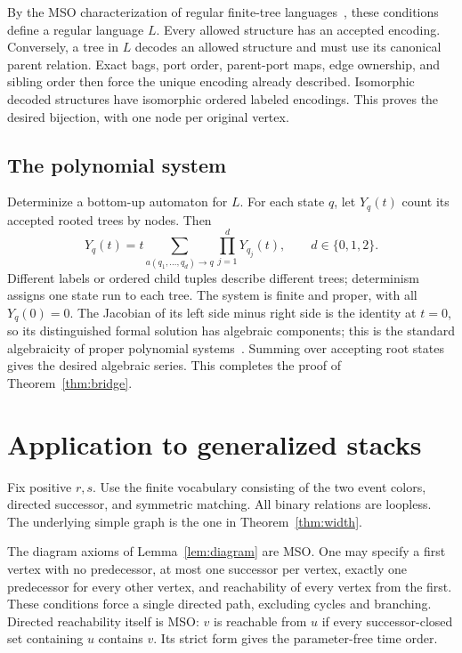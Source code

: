 \documentclass[11pt]{article}
\theoremstyle{definition}\newtheorem{definition}[theorem]{Definition}
\theoremstyle{remark}\newtheorem{remark}[theorem]{Remark}
\begin{document}
By the MSO characterization of regular finite-tree languages~\cite{ThatcherWright1968,Doner1970}, these conditions define a regular language $L$. Every allowed structure has an accepted encoding. Conversely, a tree in $L$ decodes an allowed structure and must use its canonical parent relation. Exact bags, port order, parent-port maps, edge ownership, and sibling order then force the unique encoding already described. Isomorphic decoded structures have isomorphic ordered labeled encodings. This proves the desired bijection, with one node per original vertex.

\subsection{The polynomial system}
Determinize a bottom-up automaton for $L$. For each state $q$, let $Y_q(t)$ count its accepted rooted trees by nodes. Then
\begin{equation}\label{eq:treesystem}
 Y_q(t)=t\sum_{a(q_1,\ldots,q_d)\to q}\prod_{j=1}^dY_{q_j}(t),
 \qquad d\in\{0,1,2\}.
\end{equation}
Different labels or ordered child tuples describe different trees; determinism assigns one state run to each tree. The system is finite and proper, with all $Y_q(0)=0$. The Jacobian of its left side minus right side is the identity at $t=0$, so its distinguished formal solution has algebraic components; this is the standard algebraicity of proper polynomial systems~\cite[Chapter VII]{FlajoletSedgewick2009}. Summing over accepting root states gives the desired algebraic series. This completes the proof of Theorem~\ref{thm:bridge}.

\section{Application to generalized stacks}\label{sec:application}
Fix positive $r,s$. Use the finite vocabulary consisting of the two event colors, directed successor, and symmetric matching. All binary relations are loopless. The underlying simple graph is the one in Theorem~\ref{thm:width}.

The diagram axioms of Lemma~\ref{lem:diagram} are MSO. One may specify a first vertex with no predecessor, at most one successor per vertex, exactly one predecessor for every other vertex, and reachability of every vertex from the first. These conditions force a single directed path, excluding cycles and branching. Directed reachability itself is MSO: $v$ is reachable from $u$ if every successor-closed set containing $u$ contains $v$. Its strict form gives the parameter-free time order.
\end{document}
